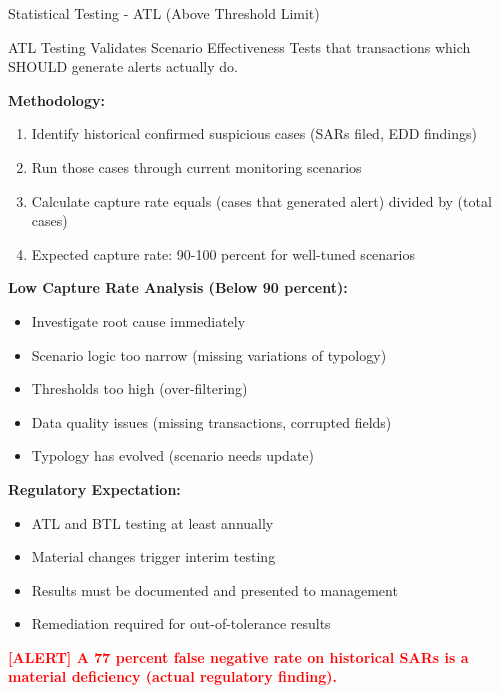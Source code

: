 \documentclass[11pt,a4paper]{beamer}
\newcommand{\redflag}[1]{\textcolor{red}{\textbf{[ALERT] #1}}}
\begin{document}
	\begin{frame}{Statistical Testing - ATL (Above Threshold Limit)}
		\begin{block}{ATL Testing Validates Scenario Effectiveness}
			Tests that transactions which SHOULD generate alerts actually do.
		\end{block}
		
		\textbf{Methodology:}
		\begin{enumerate}
			\item Identify historical confirmed suspicious cases (SARs filed, EDD findings)
			\item Run those cases through current monitoring scenarios
			\item Calculate capture rate equals (cases that generated alert) divided by (total cases)
			\item Expected capture rate: 90-100 percent for well-tuned scenarios
		\end{enumerate}
		
		\textbf{Low Capture Rate Analysis (Below 90 percent):}
		\begin{itemize}
			\item Investigate root cause immediately
			\item Scenario logic too narrow (missing variations of typology)
			\item Thresholds too high (over-filtering)
			\item Data quality issues (missing transactions, corrupted fields)
			\item Typology has evolved (scenario needs update)
		\end{itemize}
		
		\textbf{Regulatory Expectation:}
		\begin{itemize}
			\item ATL and BTL testing at least annually
			\item Material changes trigger interim testing
			\item Results must be documented and presented to management
			\item Remediation required for out-of-tolerance results
		\end{itemize}
		
		\redflag{A 77 percent false negative rate on historical SARs is a material deficiency (actual regulatory finding).}
	\end{frame}
	
\end{document}
